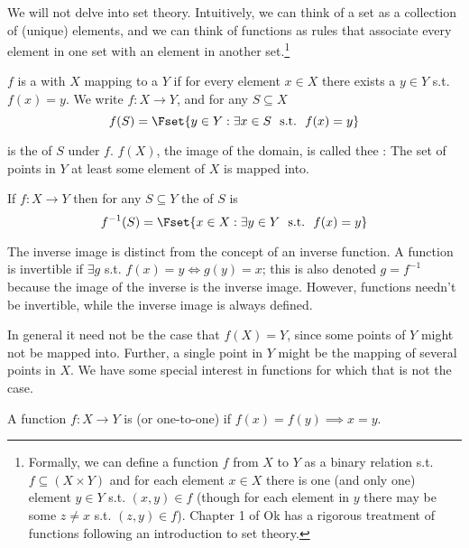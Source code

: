 \documentclass{article}
\begin{document}
We will not delve into set theory. Intuitively, we can think of a set as a collection of (unique) elements, and we can think of functions as rules that associate every element in one set with an element in another set.\footnote{Formally, we can define a function $f$ from $X$ to $Y$ as a binary relation s.t. $f \subseteq (X \times Y)$ and for each element $x \in X$ there is one (and only one) element $y \in Y$ s.t. $(x, y) \in f$ (though for each element in $y$ there may be some $z \ne x$ s.t. $(z, y) \in f$). Chapter 1 of Ok has a rigorous treatment of functions following an introduction to set theory.}
\begin{definition}[function]\label{def:lecture1_functions}
  $f$ is a  with  $X$ mapping to a  $Y$ if for every element $x \in X$ there exists a $y \in Y$ s.t. $f(x) = y$. We write $f: X \to Y$, and for any $S \subseteq X$
\[
  f(S) = \Fset{y \in Y: \exists x \in S ~~\text{s.t.}~~ f(x) = y}
\]

  is the  of $S$ under $f$. $f(X)$, the image of the domain, is called thee : The set of points in $Y$ at least some element of $X$ is mapped into.
\end{definition}

\begin{definition}\label{def:lecture1_inverse_image}
  If $f: X \to Y$ then for any $S \subseteq Y$ the  of $S$ is
  \[
    f^{-1}(S) = \Fset{
      x \in X: \exists y \in Y ~~\text{s.t.}~~ f(x) = y
    }
  \]
\end{definition}

\begin{remark}
  The inverse image is distinct from the concept of an inverse function. A function is invertible if $\exists g$ s.t. $f(x) = y \iff g(y) = x$; this is also denoted $g = f^{-1}$ because the image of the inverse is the inverse image. However, functions needn't be invertible, while the inverse image is always defined.
\end{remark}

In general it need not be the case that $f(X) = Y$, since some points of $Y$ might not be mapped into. Further, a single point in $Y$ might be the mapping of several points in $X$. We have some special interest in functions for which that is not the case.
\begin{definition}[injective]\label{def:lecture1_injective}
  A function $f: X \to Y$ is  (or one-to-one) if $f(x) = f(y) \implies x = y$.
\end{definition}
\end{document}
